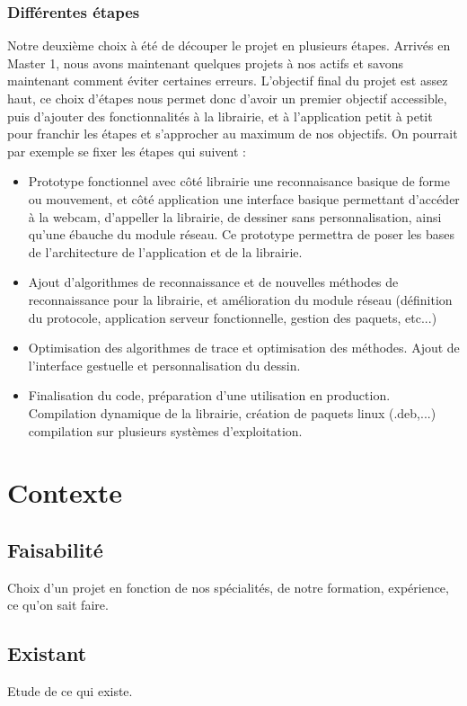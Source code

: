 \documentclass{article}
\begin{document}
				\subsubsection{Différentes étapes}
				Notre deuxième choix à été de découper le projet en plusieurs étapes. Arrivés en Master 1, nous avons maintenant quelques projets à nos actifs et savons maintenant comment éviter certaines erreurs. L'objectif final du projet est assez haut, ce choix d'étapes nous permet donc d'avoir un premier objectif accessible, puis d'ajouter des fonctionnalités à la librairie, et à l'application petit à petit pour franchir les étapes et s'approcher au maximum de nos objectifs. On pourrait par exemple se fixer les étapes qui suivent : \\
				\begin{itemize}
					\item{Prototype fonctionnel avec côté librairie une reconnaisance basique de forme ou mouvement, et côté application une interface basique permettant d'accéder à la webcam, d'appeller la librairie, de dessiner sans personnalisation, ainsi qu'une ébauche du module réseau. Ce prototype permettra de poser les bases de l'architecture de l'application et de la librairie.}
					\item{Ajout d'algorithmes de reconnaissance et de nouvelles méthodes de reconnaissance pour la librairie, et amélioration du module réseau (définition du protocole, application serveur fonctionnelle, gestion des paquets, etc...)}
					\item{Optimisation des algorithmes de trace et optimisation des méthodes. Ajout de l'interface gestuelle et personnalisation du dessin.}
					\item{Finalisation du code, préparation d'une utilisation en production. Compilation dynamique de la librairie, création de paquets linux (.deb,...) compilation sur plusieurs systèmes d'exploitation.}
				\end{itemize}
	\section{Contexte}
		\subsection{Faisabilité}
			Choix d'un projet en fonction de nos spécialités, de notre formation, expérience, ce qu'on sait faire.
		\subsection{Existant}
			Etude de ce qui existe.
\end{document}
